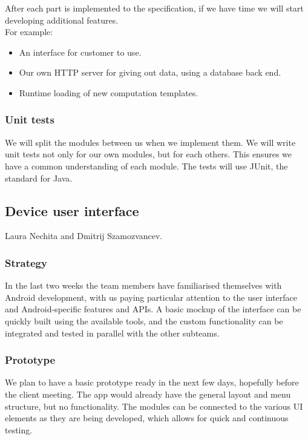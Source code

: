 \documentclass[
  twoside,
  10pt, a4paper
]{article}
\begin{document}
After each part is implemented to the specification, if we have time we will start developing additional features.\\
For example:
\begin{itemize}
\item An interface for customer to use.
\item Our own HTTP server for giving out data, using a database back end.
\item Runtime loading of new computation templates.
\end{itemize}

\subsubsection{Unit tests}

We will split the modules between us when we implement them. We will write unit tests not only for our own modules, but for each others.
This ensures we have a common understanding of each module. The tests will use JUnit, the standard for Java.







\subsection{Device user interface}

Laura Nechita and Dmitrij Szamozvancev.

\subsubsection{Strategy} 
In the last two weeks the team members have familiarised themselves with Android development, with us paying particular attention to the user interface and Android-specific features and APIs. A basic mockup of the interface can be quickly built using the available tools, and the custom functionality can be integrated and tested in parallel with the other subteams.

\subsubsection{Prototype}
We plan to have a basic prototype ready in the next few days, hopefully before the client meeting. The app would already have the general layout and menu structure, but no functionality. The modules can be connected to the various UI elements as they are being developed, which allows for quick and continuous testing. 
\end{document}
